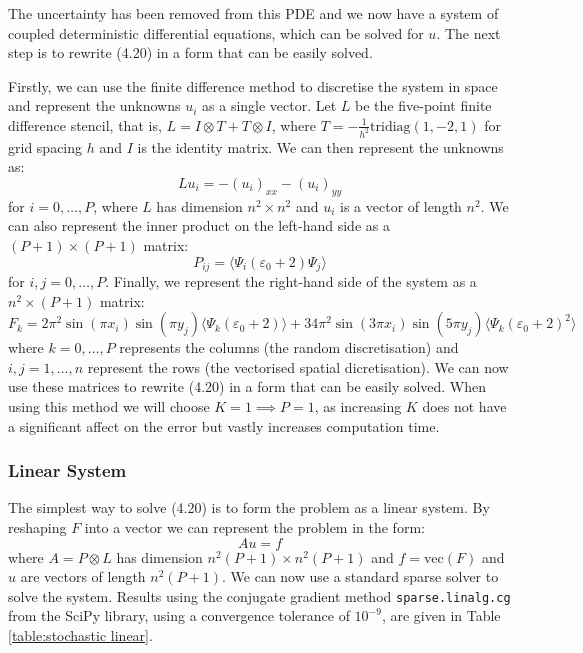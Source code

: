\documentclass[11pt]{article}
\numberwithin{equation}{section}
\begin{document}
The uncertainty has been removed from this PDE and we now have a system of coupled deterministic differential equations, which can be solved for $u$. The next step is to rewrite (4.20) in a form that can be easily solved.

Firstly, we can use the finite difference method to discretise the system in space and represent the unknowns $u_i$ as a single vector. Let $L$ be the five-point finite difference stencil, that is, $L= I \otimes T + T \otimes I$, where $T=-\frac{1}{h^2} \text{tridiag}(1,-2,1)$ for grid spacing $h$ and $I$ is the identity matrix. We can then represent the unknowns as:
\begin{equation}
Lu_i = - (u_i)_{xx} - (u_i)_{yy}
\end{equation}
for $i=0,\dots,P$, where $L$ has dimension $n^2 \times n^2$ and $u_i$ is a vector of length $n^2$. We can also represent the inner product on the left-hand side as a $(P+1) \times (P+1)$ matrix:
\begin{equation}
P_{ij} = \langle \Psi_i (\varepsilon_0 + 2) \Psi_j \rangle
\end{equation}
for $i,j = 0,\dots,P$. Finally, we represent the right-hand side of the system as a $n^2 \times (P+1)$ matrix:
\begin{equation}
F_{k} = 2\pi^2 \sin(\pi x_i)\sin(\pi y_j) \langle \Psi_k (\varepsilon_0 + 2) \rangle + 34\pi^2 \sin(3\pi x_i) \sin(5\pi y_j) \langle \Psi_k (\varepsilon_0 + 2)^2 \rangle
\end{equation}
where $k = 0, \dots, P$ represents the columns (the random discretisation) and $i,j = 1, \dots, n$ represent the rows (the vectorised spatial dicretisation). We can now use these matrices to rewrite (4.20) in a form that can be easily solved. When using this method we will choose $K=1 \implies P=1$, as increasing $K$ does not have a significant affect on the error but vastly increases computation time. 

\subsubsection*{Linear System}
The simplest way to solve (4.20) is to form the problem as a linear system. By reshaping $F$ into a vector we can represent the problem in the form:
\begin{equation}
Au = f
\end{equation} 
where $A = P \otimes L$ has dimension $n^2(P+1) \times n^2(P+1)$ and $f = \text{vec}(F)$ and $u$ are vectors of length $n^2(P+1)$. We can now use a standard sparse solver to solve the system. Results using the conjugate gradient method \texttt{sparse.linalg.cg} from the SciPy library, using a convergence tolerance of $10^{-9}$, are given in Table \ref{table:stochastic linear}.
\end{document}
